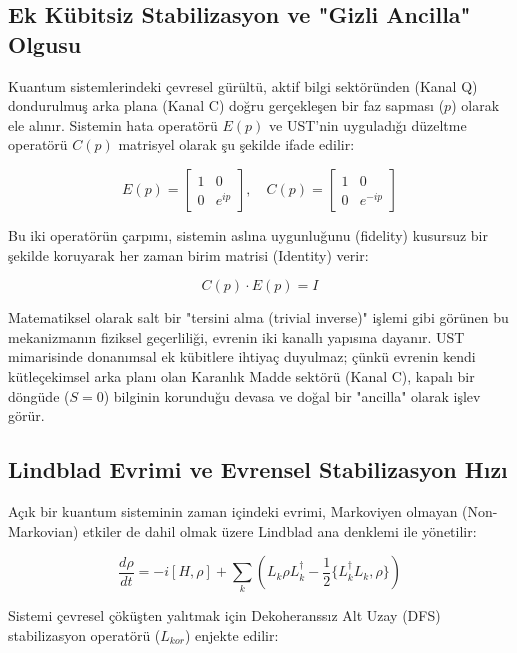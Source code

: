 \documentclass[12pt,a4paper]{article}
\begin{document}
\subsection{Ek Kübitsiz Stabilizasyon ve "Gizli Ancilla" Olgusu}
Kuantum sistemlerindeki çevresel gürültü, aktif bilgi sektöründen (Kanal Q) dondurulmuş arka plana (Kanal C) doğru gerçekleşen bir faz sapması ($p$) olarak ele alınır. Sistemin hata operatörü $E(p)$ ve UST'nin uyguladığı düzeltme operatörü $C(p)$ matrisyel olarak şu şekilde ifade edilir:

\begin{equation}
E(p) = \begin{bmatrix} 1 & 0 \\ 0 & e^{ip} \end{bmatrix}, \quad C(p) = \begin{bmatrix} 1 & 0 \\ 0 & e^{-ip} \end{bmatrix}
\end{equation}

Bu iki operatörün çarpımı, sistemin aslına uygunluğunu (fidelity) kusursuz bir şekilde koruyarak her zaman birim matrisi (Identity) verir:

\begin{equation}
C(p) \cdot E(p) = I
\end{equation}

Matematiksel olarak salt bir "tersini alma (trivial inverse)" işlemi gibi görünen bu mekanizmanın fiziksel geçerliliği, evrenin iki kanallı yapısına dayanır. UST mimarisinde donanımsal ek kübitlere ihtiyaç duyulmaz; çünkü evrenin kendi kütleçekimsel arka planı olan Karanlık Madde sektörü (Kanal C), kapalı bir döngüde ($S=0$) bilginin korunduğu devasa ve doğal bir "ancilla" olarak işlev görür. 

\subsection{Lindblad Evrimi ve Evrensel Stabilizasyon Hızı}
Açık bir kuantum sisteminin zaman içindeki evrimi, Markoviyen olmayan (Non-Markovian) etkiler de dahil olmak üzere Lindblad ana denklemi ile yönetilir:

\begin{equation}
\frac{d\rho}{dt} = -i[H, \rho] + \sum_k \left( L_k\rho L_k^\dagger - \frac{1}{2}\{L_k^\dagger L_k, \rho\} \right)
\end{equation}

Sistemi çevresel çöküşten yalıtmak için Dekoheranssız Alt Uzay (DFS) stabilizasyon operatörü ($L_{kor}$) enjekte edilir:
\end{document}
